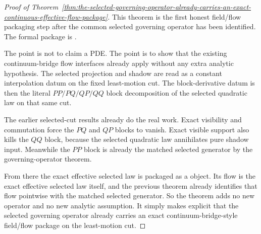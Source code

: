 \begin{proof}[Proof of Theorem~\ref{thm:the-selected-governing-operator-already-carries-an-exact-continuous-effective-flow-package}]
\label{proof:thm:the-selected-governing-operator-already-carries-an-exact-continuous-effective-flow-package}
This theorem is the first honest field/flow packaging step after the common
selected governing operator has been identified. The formal package is
.

The point is not to claim a PDE. The point is to show that the existing
continuum-bridge flow interfaces already apply without any extra analytic
hypothesis.
The selected projection and shadow are read as a constant interpolation datum
on the fixed least-motion cut. The block-derivative datum is then the literal
\(PP/PQ/QP/QQ\) block decomposition of the selected quadratic law on that same
cut.

The earlier selected-cut results already do the real work. Exact visibility
and commutation force the \(PQ\) and \(QP\) blocks to vanish. Exact visible
support also kills the \(QQ\) block, because the selected quadratic law
annihilates pure shadow input. Meanwhile the \(PP\) block is already the
matched selected generator by the governing-operator theorem.

From there the exact effective selected law is packaged as a
 object. Its flow is the exact effective
selected law itself, and the previous theorem already identifies that flow
pointwise with the matched selected generator. So the theorem adds no new
operator and no new analytic assumption. It simply makes explicit that the
selected governing operator already carries an exact continuum-bridge-style
field/flow package on the least-motion cut.
\end{proof}

